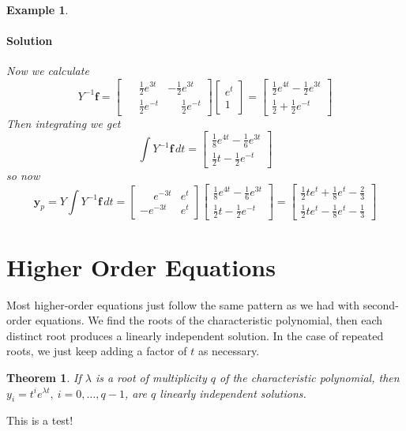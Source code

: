 \documentclass[letterpaper, 11pt, openany]{book}
\theoremstyle{mytheoremstyle}
\newtheorem{theorem}{Theorem}[section]
\theoremstyle{myexamplestyle}
\newtheorem{example}{Example}[section]
\newenvironment{solution}{\paragraph{\sffamily \smaller \fontseries{b}\selectfont Solution}}{\hfill\faSquare}
\begin{document}
\begin{example}
\begin{solution}
        Now we calculate \[Y^{-1} \mathbf{f} = \begin{bmatrix}
            \phantom{-}\frac{1}{2}e^{3t} & -\frac{1}{2} e^{3t}\\
            \phantom{-}\frac{1}{2} e^{-t} &  \phantom{-}\frac{1}{2}e^{-t}
       \end{bmatrix} \begin{bmatrix}e^{t} \\ 1\end{bmatrix} = 
       \begin{bmatrix}
            \frac{1}{2}e^{4t}  -\frac{1}{2}e^{3t}\\
            \frac{1}{2} + \frac{1}{2} e^{-t}
       \end{bmatrix}\]
       Then integrating we get \[\int Y^{-1} \mathbf{f} \, dt = \begin{bmatrix}\frac{1}{8}e^{4 t}-\frac{1}{6}e^{3 t} \\
        \frac{1}{2}t-\frac{1}{2}e^{-t}\end{bmatrix}\]
        so now
        \[\mathbf{y}_{p} = Y \int Y^{-1} \mathbf{f} \, dt  = \begin{bmatrix}
            \phantom{-}e^{-3t} & e^{t}\\
           -e^{-3t} & e^{t}
       \end{bmatrix}
       \begin{bmatrix}\frac{1}{8}e^{4 t}-\frac{1}{6}e^{3 t} \\
        \frac{1}{2}t-\frac{1}{2}e^{-t}\end{bmatrix} = \begin{bmatrix}
            \frac{1}{2}t e^t +\frac{1}{8}e^t-\frac{2}{3} \\
            \frac{1}{2} t e^t -\frac{1}{8}e^t-\frac{1}{3}
        \end{bmatrix}
       \]
    \end{solution}
\end{example}

\section{Higher Order Equations}
Most higher-order equations just follow the same pattern as we had with second-order equations. We find the roots of the characteristic polynomial, then each distinct root produces a linearly independent solution. In the case of repeated roots, we just keep adding a factor of \(t\) as necessary.
\begin{theorem}\label{t:de-repeated-root-general-case}
    If \(\lambda\) is a root of multiplicity \(q\) of the characteristic polynomial, then \(y_{i} = t^{i} e^{\lambda t}, \ i = 0, \ldots, q-1\), are \(q\) linearly independent solutions.
\end{theorem}

This is a test!
\end{document}
